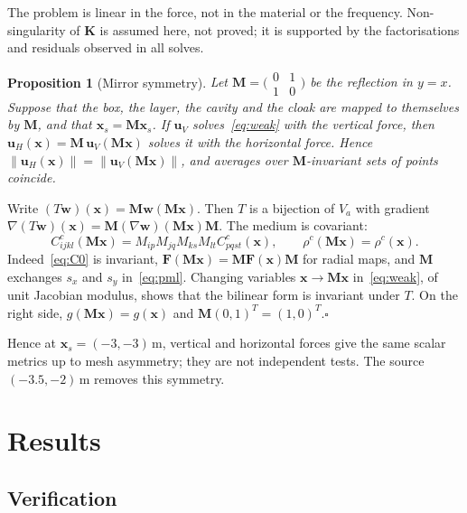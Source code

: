 \documentclass[preprint,12pt]{elsarticle}
\newcommand{\mbf}[1]{\mathbf{#1}}
\newcommand{\qedbox}{\hfill$\square$}
\newtheorem{proposition}{Proposition}
\begin{document}
The problem is linear in the force, not in the material or the frequency. Non-singularity of $\mbf{K}$ is assumed here, not proved; it is supported by the factorisations and residuals observed in all solves.

\begin{proposition}[Mirror symmetry]\label{prop:mirror}
Let $\mbf{M}=\bigl(\begin{smallmatrix}0&1\\1&0\end{smallmatrix}\bigr)$ be the reflection in $y=x$. Suppose that the box, the layer, the cavity and the cloak are mapped to themselves
by $\mbf{M}$, and that $\mbf{x}_s=\mbf{M}\mbf{x}_s$. If $\mbf{u}_V$ solves~\eqref{eq:weak} with the vertical force, then
$\mbf{u}_H(\mbf{x})=\mbf{M}\,\mbf{u}_V(\mbf{M}\mbf{x})$ solves it with the horizontal force. Hence $\|\mbf{u}_H(\mbf{x})\|=\|\mbf{u}_V(\mbf{M}\mbf{x})\|$, and averages over $\mbf{M}$-invariant sets of points coincide.
\end{proposition}

\begin{pf}
Write $(T\mbf{w})(\mbf{x})=\mbf{M}\mbf{w}(\mbf{M}\mbf{x})$. Then $T$ is a bijection of $V_a$ with gradient
$\nabla(T\mbf{w})(\mbf{x})=\mbf{M}(\nabla\mbf{w})(\mbf{M}\mbf{x})\mbf{M}$. The medium is covariant:
\[C^c_{ijkl}(\mbf{M}\mbf{x})=M_{ip}M_{jq}M_{ks}M_{lt}C^c_{pqst}(\mbf{x}),\qquad \rho^c(\mbf{M}\mbf{x})=\rho^c(\mbf{x}).\]
Indeed~\eqref{eq:C0} is invariant, $\mbf{F}(\mbf{M}\mbf{x})=\mbf{M}\mbf{F}(\mbf{x})\mbf{M}$ for radial maps, and $\mbf{M}$ exchanges
$s_x$ and $s_y$ in~\eqref{eq:pml}. Changing variables $\mbf{x}\to\mbf{M}\mbf{x}$ in~\eqref{eq:weak}, of unit Jacobian modulus, shows that the bilinear form is invariant under $T$. On the right side, $g(\mbf{M}\mbf{x})=g(\mbf{x})$ and $\mbf{M}(0,1)^{T}=(1,0)^{T}$.\qedbox
\end{pf}

Hence at $\mbf{x}_s=(-3,-3)$\,m, vertical and horizontal forces give the same scalar metrics up to mesh asymmetry; they are not independent tests.
The source $(-3.5,-2)$\,m removes this symmetry.

\section{Results}\label{sec:results}

\subsection{Verification}
\end{document}
